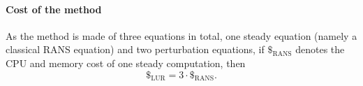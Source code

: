 \paragraph{Cost of the method}
As the method is made of three equations in total, one steady equation 
(namely a classical RANS equation) and two perturbation equations, 
if $\mathdollar_{\text{RANS}}$ 
denotes the CPU and memory cost of
one steady computation, then
\begin{equation}
	\mathdollar_{\text{LUR}} = 3 \cdot \mathdollar_{\text{RANS}}.
\end{equation}